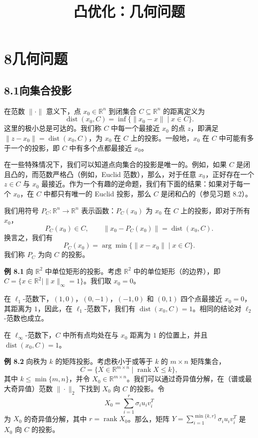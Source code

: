 \documentclass[UTF8, 12pt, fontset=fandol, oneside]{ctexart}
\title{凸优化：几何问题}
\author{}
\date{}
\begin{document}
\maketitle

\section*{8\quad 几何问题}

\subsection*{8.1\quad 向集合投影}

在范数 $\|\cdot\|$ 意义下，点 $x_0\in\mathbb{R}^n$ 到闭集合 $C\subseteq\mathbb{R}^n$ 的距离定义为
\[
\operatorname{dist}(x_0,C)=\inf\{\|x_0-x\|\mid x\in C\}.
\]
这里的极小总是可达的。我们称 $C$ 中每一个最接近 $x_0$ 的点 $z$，即满足 $\|z-x_0\|=\operatorname{dist}(x_0,C)$，为 $x_0$ 在 $C$ 上的投影。一般地，$x_0$ 在 $C$ 中可能有多于一个的投影，即 $C$ 中有多个点都最接近 $x_0$。

在一些特殊情况下，我们可以知道点向集合的投影是唯一的。例如，如果 $C$ 是闭且凸的，而范数严格凸（例如，Euclid 范数），那么，对于任意 $x_0$，正好存在一个 $z\in C$ 与 $x_0$ 最接近。作为一个有趣的逆命题，我们有下面的结果：如果对于每一个 $x_0$，在 $C$ 中都只有唯一的 Euclid 投影，那么 $C$ 是闭和凸的（参见习题 8.2）。

我们用符号 $P_C:\mathbb{R}^n\to\mathbb{R}^n$ 表示函数：$P_C(x_0)$ 为 $x_0$ 在 $C$ 上的投影，即对于所有 $x_0$，
\[
P_C(x_0)\in C,\qquad \|x_0-P_C(x_0)\|=\operatorname{dist}(x_0,C).
\]
换言之，我们有
\[
P_C(x_0)=\arg\min\{\|x-x_0\|\mid x\in C\}.
\]
我们称 $P_C$ 为向 $C$ 的投影。

\noindent\textbf{例 8.1}\quad
向 $\mathbb{R}^2$ 中单位矩形的投影。考虑 $\mathbb{R}^2$ 中的单位矩形（的边界），即 $C=\{x\in\mathbb{R}^2\mid \|x\|_\infty=1\}$。我们取 $x_0=0$。

在 $\ell_1$-范数下，$(1,0)$，$(0,-1)$，$(-1,0)$ 和 $(0,1)$ 四个点最接近 $x_0=0$，其距离为 $1$，因此，在 $\ell_1$-范数下，我们有 $\operatorname{dist}(x_0,C)=1$。相同的结论对 $\ell_2$-范数也成立。

在 $\ell_\infty$-范数下，$C$ 中所有点均处在与 $x_0$ 距离为 $1$ 的位置上，并且 $\operatorname{dist}(x_0,C)=1$。

\noindent\textbf{例 8.2}\quad
向秩为 $k$ 的矩阵投影。考虑秩小于或等于 $k$ 的 $m\times n$ 矩阵集合，
\[
C=\{X\in\mathbb{R}^{m\times n}\mid \operatorname{rank}X\leq k\},
\]
其中 $k\leq \min\{m,n\}$，并令 $X_0\in\mathbb{R}^{m\times n}$。我们可以通过奇异值分解，在（谱或最大奇异值）范数 $\|\cdot\|_2$ 下找到 $X_0$ 向 $C$ 的投影。令
\[
X_0=\sum_{i=1}^r\sigma_i u_i v_i^T
\]
为 $X_0$ 的奇异值分解，其中 $r=\operatorname{rank}X_0$。那么，矩阵 $Y=\sum_{i=1}^{\min\{k,r\}}\sigma_i u_i v_i^T$ 是 $X_0$ 向 $C$ 的投影。
\end{document}
